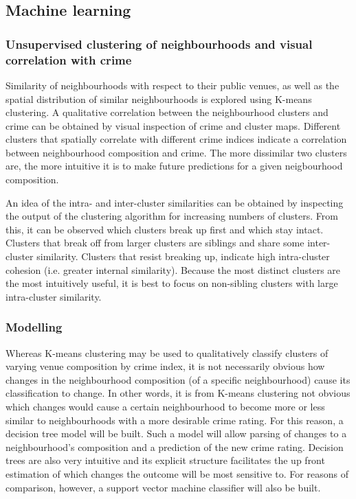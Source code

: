 \documentclass{article}
\begin{document}
\subsection{Machine learning}
\subsubsection{Unsupervised clustering of neighbourhoods and visual correlation with crime}
Similarity of neighbourhoods with respect to their public venues, as well as the spatial distribution of similar neighbourhoods is explored using K-means clustering. A qualitative correlation between the neighbourhood clusters and crime can be obtained by visual inspection of crime and cluster maps. Different clusters that spatially correlate with different crime indices indicate a correlation between neighbourhood composition and crime. The more dissimilar two clusters are, the more intuitive it is to make future predictions for a given neigbourhood composition. 

An idea of the intra- and inter-cluster similarities can be obtained by inspecting the output of the clustering algorithm for increasing numbers of clusters. From this, it can be observed which clusters break up first and which stay intact.  Clusters that break off from larger clusters are siblings and share some inter-cluster similarity. Clusters that resist breaking up, indicate high intra-cluster cohesion (i.e. greater internal similarity). Because the most distinct clusters are the most intuitively useful, it is best to focus on non-sibling clusters with large intra-cluster similarity.

\subsubsection{Modelling}
Whereas K-means clustering may be used to qualitatively classify clusters of varying venue composition by crime index, it is not necessarily obvious how changes in the neighbourhood composition (of a specific neighbourhood) cause its classification to change. In other words, it is from K-means clustering not obvious which changes would cause a certain neighbourhood to become more or less similar to neighbourhoods with a more desirable crime rating. For this reason, a decision tree model will be built. Such a model will allow parsing of changes to a neighbourhood's composition and a prediction of the new crime rating. Decision trees are also very intuitive and its explicit structure facilitates the up front estimation of which changes the outcome will be most sensitive to. For reasons of comparison, however, a support vector machine classifier will also be built.
\end{document}
